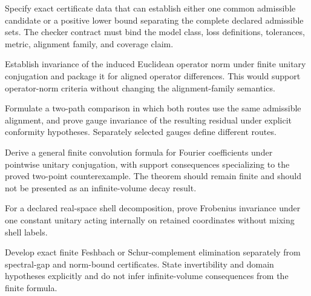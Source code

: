 \begin{openproblem}
Specify exact certificate data that can establish either one common admissible candidate
or a positive lower bound separating the complete declared admissible sets.  The checker
contract must bind the model class, loss definitions, tolerances, metric, alignment
family, and coverage claim.
\end{openproblem}

\begin{openproblem}
Establish invariance of the induced Euclidean operator norm under finite unitary
conjugation and package it for aligned operator differences.  This would support
operator-norm criteria without changing the alignment-family semantics.
\end{openproblem}

\begin{openproblem}
Formulate a two-path comparison in which both routes use the same admissible alignment,
and prove gauge invariance of the resulting residual under explicit conformity
hypotheses.  Separately selected gauges define different routes.
\end{openproblem}

\begin{openproblem}
Derive a general finite convolution formula for Fourier coefficients under pointwise
unitary conjugation, with support consequences specializing to the proved two-point
counterexample.  The theorem should remain finite and should not be presented as an
infinite-volume decay result.
\end{openproblem}

\begin{openproblem}
For a declared real-space shell decomposition, prove Frobenius invariance under one
constant unitary acting internally on retained coordinates without mixing shell labels.
\end{openproblem}

\begin{openproblem}
Develop exact finite Feshbach or Schur-complement elimination separately from
spectral-gap and norm-bound certificates.  State invertibility and domain hypotheses
explicitly and do not infer infinite-volume consequences from the finite formula.
\end{openproblem}

